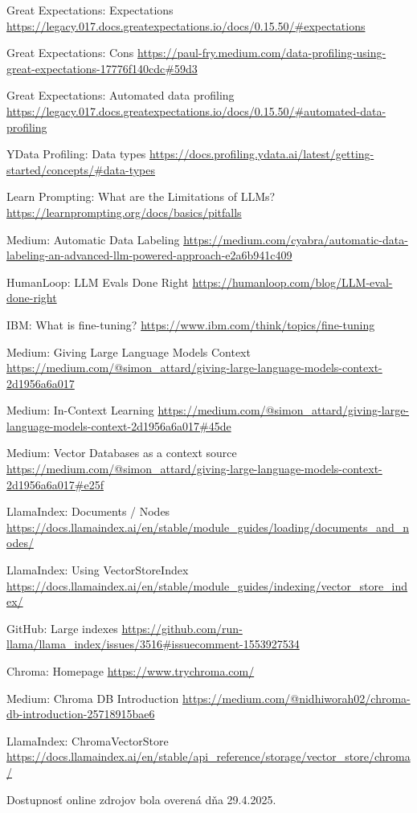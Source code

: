 \begin{thebibliography}{99}
Great Expectations: Expectations
\url{https://legacy.017.docs.greatexpectations.io/docs/0.15.50/#expectations}

Great Expectations: Cons
\url{https://paul-fry.medium.com/data-profiling-using-great-expectations-17776f140cdc#59d3}

Great Expectations: Automated data profiling
\url{https://legacy.017.docs.greatexpectations.io/docs/0.15.50/#automated-data-profiling}

YData Profiling: Data types
\url{https://docs.profiling.ydata.ai/latest/getting-started/concepts/#data-types}

Learn Prompting: What are the Limitations of LLMs?
\url{https://learnprompting.org/docs/basics/pitfalls}

Medium: Automatic Data Labeling
\url{https://medium.com/cyabra/automatic-data-labeling-an-advanced-llm-powered-approach-e2a6b941c409}

HumanLoop: LLM Evals Done Right
\url{https://humanloop.com/blog/LLM-eval-done-right}

IBM: What is fine-tuning?
\url{https://www.ibm.com/think/topics/fine-tuning}

Medium: Giving Large Language Models Context
\url{https://medium.com/@simon_attard/giving-large-language-models-context-2d1956a6a017}

Medium: In-Context Learning
\url{https://medium.com/@simon_attard/giving-large-language-models-context-2d1956a6a017#45de}

Medium: Vector Databases as a context source
\url{https://medium.com/@simon_attard/giving-large-language-models-context-2d1956a6a017#e25f}

LlamaIndex: Documents / Nodes
\url{https://docs.llamaindex.ai/en/stable/module_guides/loading/documents_and_nodes/}

LlamaIndex: Using VectorStoreIndex
\url{https://docs.llamaindex.ai/en/stable/module_guides/indexing/vector_store_index/}

GitHub: Large indexes
\url{https://github.com/run-llama/llama_index/issues/3516#issuecomment-1553927534}

Chroma: Homepage
\url{https://www.trychroma.com/}

Medium: Chroma DB Introduction
\url{https://medium.com/@nidhiworah02/chroma-db-introduction-25718915bae6}

LlamaIndex: ChromaVectorStore
\url{https://docs.llamaindex.ai/en/stable/api_reference/storage/vector_store/chroma/}
\end{thebibliography}

Dostupnosť online zdrojov bola overená dňa 29.4.2025.
